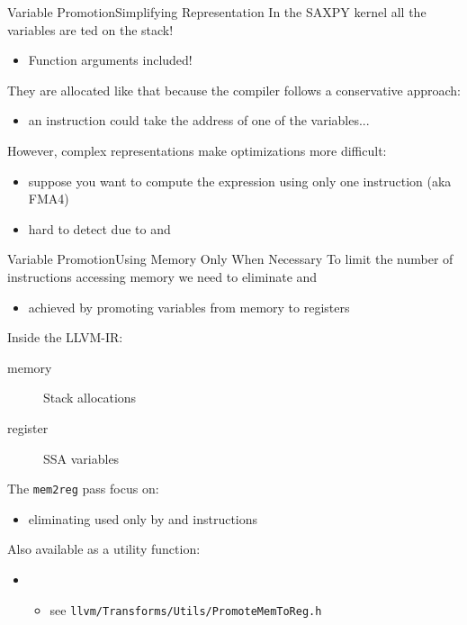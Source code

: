\begin{frame}{Variable Promotion}{Simplifying Representation}
In the SAXPY kernel all the variables are ted on the stack!
\begin{itemize}
\item Function arguments included!
\end{itemize}

\vfill
They are allocated like that because the compiler follows a \alert{conservative} approach:
\begin{itemize}
\item an instruction could take the address of one of the variables...
\end{itemize}

\vfill
However, complex representations make optimizations more difficult:
\begin{itemize}
\item suppose you want to compute the  expression using only \alert{one}
      instruction (aka FMA4)
\item hard to detect due to  and 
\end{itemize}
\end{frame}


\begin{frame}{Variable Promotion}{Using Memory Only When Necessary}
To limit the number of instructions accessing memory we need to eliminate  and 
\begin{itemize}
\item achieved by \alert{promoting} variables from memory to registers
\end{itemize}

\vfill
Inside the LLVM-IR:
\begin{description}
\item[memory] Stack allocations \\
\item[register] SSA variables \\
\end{description}

\vfill
The \texttt{mem2reg} pass focus on:
\begin{itemize}
\item eliminating  used only by  and
       instructions
\end{itemize}

Also available as a utility function:
\begin{itemize}
\item {}\\
\begin{itemize}
\item see \texttt{llvm/Transforms/Utils/PromoteMemToReg.h}
\end{itemize}
\end{itemize}
\end{frame}


